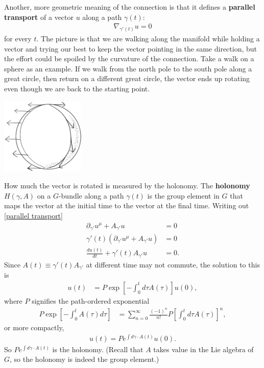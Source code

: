 \documentclass[aps,nofootinbib]{revtex4}
\begin{document}
Another, more geometric meaning of the connection is that it defines a {\bf parallel transport} of a vector $u$ along a path $\gamma (t)$:
\begin{align}\label{parallel transport}
\nabla_{\gamma'(t)} u = 0
\end{align}
for every $t$. The picture is that we are walking along the manifold while holding a vector and trying our best to keep the vector pointing in the same direction, but the effort could be spoiled by the curvature of the connection. Take a walk on a sphere as an example. If we walk from the north pole to the south pole along a great circle, then return on a different great circle, the vector ends up rotating even though we are back to the starting point.
\begin{center}
\includegraphics[width=0.3\textwidth]{parallel.png}
\end{center}
How much the vector is rotated is measured by the holonomy. The {\bf holonomy} $H\left( \gamma, A \right)$ on a $G$-bundle along a path $\gamma(t)$ is the group element in $G$ that maps the vector at the initial time to the vector at the final time. Writing out \eqref{parallel transport}
\begin{align}\label{parallel transport eq}
\partial_{\gamma'} u^{\mu} + A_{\gamma'} u &= 0 \nonumber \\
\gamma'(t) \left( \partial_{\gamma'} u^{\mu} + A_{\gamma'} u \right) &= 0 \nonumber \\
\frac{du(t)}{dt} + \gamma'(t) A_{\gamma'} u &= 0.
\end{align}
Since $A(t) \equiv \gamma'(t) A_{\gamma'} $ at different time may not commute, the solution to this is
\begin{align}
u(t) &= P\exp \left[-\int_0^t d\tau A(\tau) \right] u(0),
\end{align}
where $P$ signifies the path-ordered exponential
\begin{align}
P\exp \left[-\int_0^t A(\tau) d\tau \right] &= \sum_{n=0}^{\infty} \frac{(-1)^n}{n!} P \left[ \int_0^t d\tau A(\tau) \right]^n,
\end{align}
or more compactly,
\begin{align}
u(t) = Pe^{\int d\gamma \cdot A(t)} u(0).
\end{align}
So $Pe^{\int d\gamma \cdot A(t)}$ is the holonomy. (Recall that $A$ takes value in the Lie algebra of $G$, so the holonomy is indeed the group element.)
\end{document}
